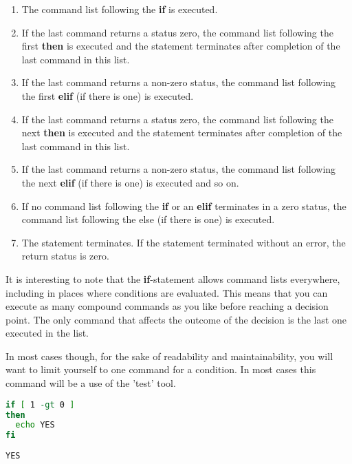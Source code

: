 \begin{enumerate}
	\item The command list following the \textbf{if} is executed.
	\item If the last command returns a status zero, the command list following
the first \textbf{then} is executed and the statement terminates after
completion of the last command in this list.
	\item If the last command returns a non-zero status, the command list
following the first \textbf{elif} (if there is one) is executed.
	\item If the last command returns a status zero, the command list following
the next \textbf{then} is executed and the statement terminates after
completion of the last command in this list.
	\item If the last command returns a non-zero status, the command list
following the next \textbf{elif} (if there is one) is executed and so on.
	\item If no command list following the \textbf{if} or an \textbf{elif}
terminates in a zero status, the command list following the else (if there is
one) is executed.
	\item The statement terminates. If the statement terminated without an
error, the return status is zero.
\end{enumerate}

It is interesting to note that the \textbf{if}-statement allows command lists
everywhere, including in places where conditions are evaluated. This means that
you can execute as many compound commands as you like before reaching a
decision point. The only command that affects the outcome of the decision is
the last one executed in the list.

In most cases though, for the sake of readability and maintainability, you will
want to limit yourself to one command for a condition. In most cases this
command will be a use of the 'test' tool.


\lstset{basicstyle=\scriptsize, numbers=left, captionpos=b, tabsize=4}
\begin{lstlisting}[caption=Example of a simple if statement,language={bash},
breaklines=true,xleftmargin=15pt,label=lst:Example of a simple if statement]
if [ 1 -gt 0 ]
then
  echo YES
fi
\end{lstlisting}

\scriptsize
\begin{verbatim}
YES
\end{verbatim}
\normalsize


